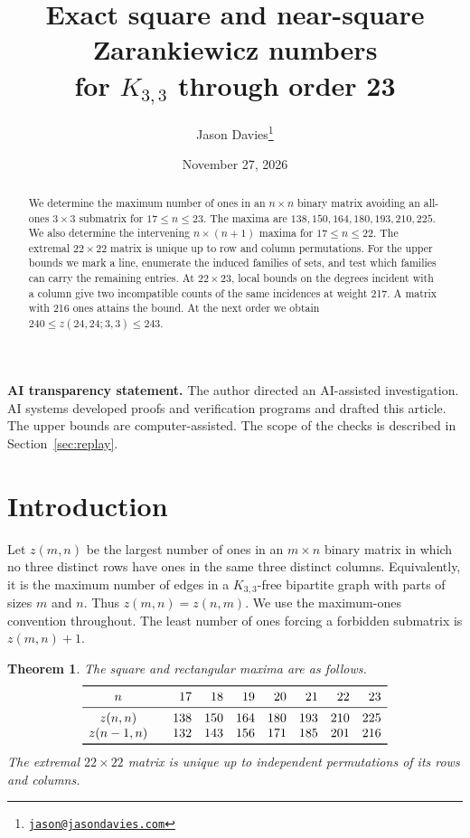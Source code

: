 \documentclass[11pt]{article}
\title{Exact square and near-square Zarankiewicz numbers\\for $K_{3,3}$ through order 23}
\author{Jason Davies\thanks{\href{mailto:jason@jasondavies.com}{\nolinkurl{jason@jasondavies.com}}}}
\date{November 27, 2026}
\newtheorem{theorem}{Theorem}
\begin{document}
\maketitle
\begin{abstract}
We determine the maximum number of ones in an $n\times n$ binary matrix
avoiding an all-ones $3\times3$ submatrix for $17\le n\le23$. The maxima
are $138,150,164,180,193,210,225$. We also determine the intervening
$n\times(n+1)$ maxima for $17\le n\le22$. The extremal $22\times22$
matrix is unique up to row and column permutations. For the upper bounds
we mark a line, enumerate the induced families of sets, and test which
families can carry the remaining entries. At $22\times23$, local bounds
on the degrees incident with a column give two incompatible counts of the
same incidences at weight 217. A matrix with 216 ones attains the bound.
At the next order we obtain $240\le z(24,24;3,3)\le243$.
\end{abstract}

\noindent\textbf{AI transparency statement.} The author directed an
AI-assisted investigation. AI systems developed proofs and verification
programs and drafted this article. The upper bounds are computer-assisted.
The scope of the checks is described in Section~\ref{sec:replay}.

\section{Introduction}
Let $z(m,n)$ be the largest number of ones in an $m\times n$ binary matrix
in which no three distinct rows have ones in the same three distinct columns.
Equivalently, it is the maximum number of edges in a $K_{3,3}$-free bipartite
graph with parts of sizes $m$ and $n$. Thus $z(m,n)=z(n,m)$. We use the
maximum-ones convention throughout. The least number of ones forcing a
forbidden submatrix is $z(m,n)+1$.

\begin{theorem}\label{thm:main}
The square and rectangular maxima are as follows.
\[
\begin{array}{c@{\qquad}rrrrrrr}
\toprule
n&17&18&19&20&21&22&23\\
\midrule
z(n,n)&138&150&164&180&193&210&225\\
z(n-1,n)&132&143&156&171&185&201&216\\
\bottomrule
\end{array}
\]
The extremal $22\times22$ matrix is unique up to independent
permutations of its rows and columns.
\end{theorem}
\end{document}

